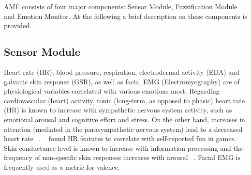 AME consists of four major components: Sensor Module, Fuzzification Module and Emotion Monitor. At the following a brief description on these components is provided.

\subsection{Sensor Module}

Heart rate (HR), blood pressure, respiration, electrodermal activity (EDA) and galvanic skin response (GSR), as well as facial EMG (Electromyography) are of physiological variables correlated with various emotions most. %
Regarding cardiovascular (heart) activity, tonic (long-term, as opposed to phasic) heart rate (HR) is known to increase with sympathetic nervous system activity, such as emotional arousal and cognitive effort and stress. On the other hand, increases in attention (mediated in the parasympathetic nervous system) lead to a decreased heart rate ~\cite{ravaja2004contributions}. ~\cite{yannakakis2008entertainment} found HR features to correlate with self-reported fun in games. %
Skin conductance level is known to increase with information processing and the frequency of non-specific skin responses increases with arousal ~\cite{ravaja2004contributions}. %
Facial EMG is frequently used as a metric for valence. %
